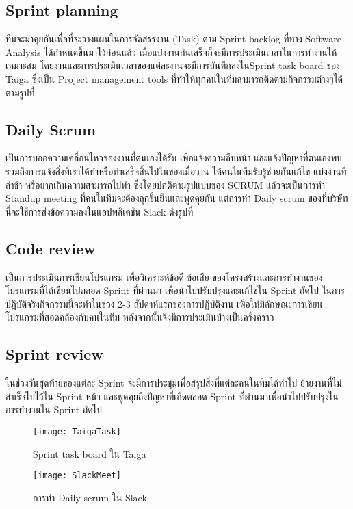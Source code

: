 \subsection{Sprint planning}
ทีมจะมาคุยกันเพื่อที่จะวางแผนในการจัดสรรงาน (Task) ตาม Sprint backlog ที่ทาง Software Analysis ได้กำหนดขึ้นมาไว้ก่อนแล้ว เมื่อแบ่งงานกันเสร็จก็จะมีการประเมินเวลาในการทำงานให้เหมาะสม โดยงานและการประเมินเวลาของแต่ละงานจะมีการบันทึกลงในSprint task board ของ Taiga ซึ่งเป็น Project management tools ที่ทำให้ทุกคนในทีมสามารถติดตามกิจกรรมต่างๆได้ ตามรูปที่
\subsection{Daily Scrum}
เป็นการบอกความเคลื่อนไหวของงานที่ตนเองได้รับ เพื่อแจ้งความคืบหน้า และแจ้งปัญหาที่ตนเองพบ รวมถึงการแจ้งสิ่งที่เราได้ทำหรือทำเสร็จสิ้นไปในของเมื่อวาน ให้คนในทีมรับรู้ช่วยกันแก้ไข แบ่งงานที่ล่าช้า หรือยากเกินความสามารถไปทำ ซึ่งโดยปกติตามรูปแบบของ SCRUM แล้วจะเป็นการทำ Standup meeting ที่คนในทีมจะต้องลุกขึ้นยืนและพูดคุยกัน แต่การทำ Daily scrum ของที่บริษัทนี้จะใช้การส่งข้อความลงในแอปพลิเคชัน Slack ดังรูปที่
\subsection{Code review}
เป็นการประเมินการเขียนโปรแกรม เพื่อวิเคราะห์ข้อดี ข้อเสีย ของโครงสร้างและการทำงานของโปรแกรมที่ได้เขียนไปตลอด Sprint ที่ผ่านมา เพื่อนำไปปรับปรุงและแก้ไขใน Sprint ถัดไป ในการปฏิบัติจริงกิจกรรมนี้จะทำในช่วง 2-3 สัปดาห์แรกของการปฏิบัติงาน เพื่อให้มีลักษณะการเขียนโปรแกรมที่สอดคล้องกับคนในทีม หลังจากนั้นจึงมีการประเมินบ้างเป็นครั้งคราว
\subsection{Sprint review}
ในช่วงวันสุดท้ายของแต่ละ Sprint จะมีการประชุมเพื่อสรุปสิ่งที่แต่ละคนในทีมได้ทำไป ย้ายงานที่ไม่สำเร็จไปไว้ใน Sprint หน้า และพูดคุยถึงปัญหาที่เกิดตลอด Sprint ที่ผ่านมาเพื่อนำไปปรับปรุงในการทำงานใน Sprint  ถัดไป 
\begin{figure}[h]
	\centering
	\texttt{[image: TaigaTask]}
	\caption{Sprint task board ใน Taiga}
\end{figure}
\begin{figure}[h]
	\centering
	\texttt{[image: SlackMeet]}
	\caption{การทำ Daily scrum ใน Slack}
\end{figure}